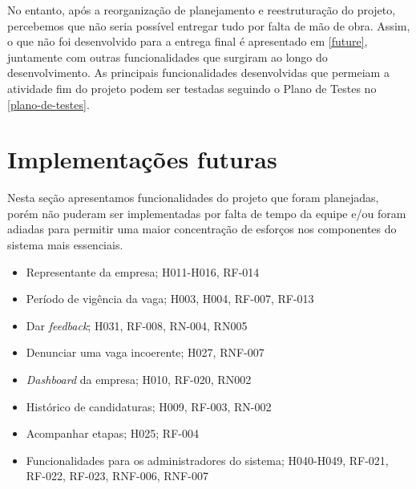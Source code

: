 No entanto, após a reorganização de planejamento e reestruturação do projeto, percebemos que não seria possível entregar tudo por falta de mão de obra. Assim, o que não foi desenvolvido para a entrega final é apresentado em \autoref{future}, juntamente com outras funcionalidades que surgiram ao longo do desenvolvimento. As principais funcionalidades desenvolvidas que permeiam a atividade fim do projeto podem ser testadas seguindo o Plano de Testes no \autoref{plano-de-testes}.

\section{Implementações futuras}\label{future}
Nesta seção apresentamos funcionalidades do projeto que foram planejadas, porém não puderam ser implementadas por falta de tempo da equipe e/ou foram adiadas para permitir uma maior concentração de esforços nos componentes do sistema mais essenciais.

\begin{itemize}
	\item Representante da empresa; H011-H016, RF-014
	\item Período de vigência da vaga; H003, H004, RF-007, RF-013
	\item Dar \textit{feedback}; H031, RF-008, RN-004, RN005
	\item Denunciar uma vaga incoerente; H027, RNF-007
	\item \textit{Dashboard} da empresa; H010, RF-020, RN002
	\item Histórico de candidaturas; H009, RF-003, RN-002
	\item Acompanhar etapas; H025; RF-004
	\item Funcionalidades para os administradores do sistema; H040-H049, RF-021, RF-022, RF-023, RNF-006, RNF-007
\end{itemize}